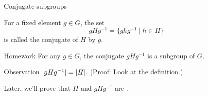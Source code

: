 \documentclass[8pt, handout]{beamer}
\newcommand{\Pause}{\pause}      %
\begin{document}
\begin{frame}{Conjugate subgroups} %
  
  For a fixed element $g\in G$, the set
  \[
  gHg^{-1}=\big\{ghg^{-1}\mid h\in H\big\}
  \]
  is called the \alert{conjugate} of $H$ by $g$.
  
  \smallskip\Pause
  
  \begin{block}{Homework}
    For any $g\in G$, the conjugate $gHg^{-1}$ is a \alert{subgroup} of $G$.
  \end{block}

  \Pause

  \begin{block}{Observation}
    $|gHg^{-1}| = |H|$. (Proof: Look at the definition.)
  \end{block} 

  \smallskip\Pause
  
  Later, we'll prove that $H$ and $gHg^{-1}$ are .
  
\end{frame}

\end{document}
